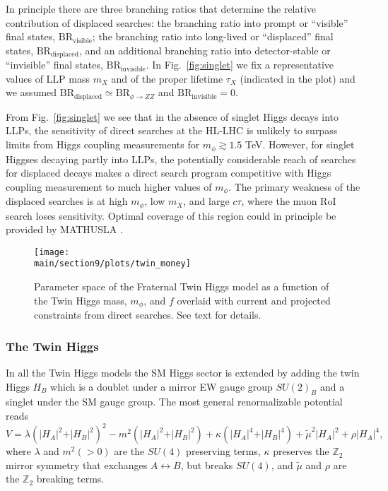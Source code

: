 In principle there are three branching ratios that determine the relative contribution of displaced searches: the branching ratio into prompt or ``visible'' final states, $\text{BR}_{\text{visible}}$; the branching ratio into long-lived or ``displaced'' final states, $\text{BR}_{\text{displaced}}$, and an additional branching ratio into detector-stable or ``invisible'' final states, $\text{BR}_{\text{invisible}}$. In Fig.~\ref{fig:singlet} we fix a representative values of LLP mass $m_X$ and of the proper lifetime $\tau_X$ (indicated in the plot) and we assumed $ \text{BR}_{\text{displaced}} \simeq \text{BR}_{\phi \rightarrow ZZ}$ and $\text{BR}_{\text{invisible}} = 0$. 

From Fig.~\ref{fig:singlet} we see that in the absence of singlet Higgs decays into LLPs, the sensitivity of direct searches at the HL-LHC is unlikely to surpass limits from Higgs coupling measurements for $m_\phi \gtrsim 1.5$ TeV. However, for singlet Higgses decaying partly into LLPs, the potentially considerable reach of searches for displaced decays makes a direct search program competitive with Higgs coupling measurement to much higher values of $m_\phi$. The primary weakness of the displaced searches is at high $m_\phi$, low $m_X$, and large $c \tau$, where the muon RoI search loses sensitivity. Optimal coverage of this region could in principle be provided by MATHUSLA \cite{Curtin:2018mvb}.


\begin{figure}[h!]
\centering
\texttt{[image: \\main/section9/plots/twin\_money]}
\caption{Parameter space of the Fraternal Twin Higgs model as a function of the Twin Higgs mass, $m_\phi$, and $f$ overlaid with current and projected constraints from direct searches. See text for details.
\label{fig:twinmoney}
}
\end{figure}


\subsubsection{The Twin Higgs}
In all the Twin Higgs models the SM Higgs sector is extended by adding the twin Higgs $H_B$ which is a doublet under a mirror EW gauge group $SU(2)_B$ and a singlet under the SM gauge group. The most general renormalizable potential reads 
\begin{equation}
V=\lambda\left(\vert H_A\vert^2+\vert H_B\vert^2\right)^2-m^2\left(\vert H_A\vert^2+\vert H_B\vert^2\right)+\kappa\left(\vert H_A\vert^4+\vert H_B\vert^4\right)+\tilde{\mu}^2\vert H_A\vert^2+\rho \vert H_A\vert^4,\label{eq:V_TH}
\end{equation}
where $\lambda$ and $m^2 (>0)$ are the $SU(4)$ preserving terms, $\kappa$ preserves the $\mathbb{Z}_2$ mirror symmetry that exchanges $A\leftrightarrow B$, but breaks $SU(4)$, and $\tilde\mu$ and $\rho$ are the $\mathbb{Z}_2$ breaking terms.

